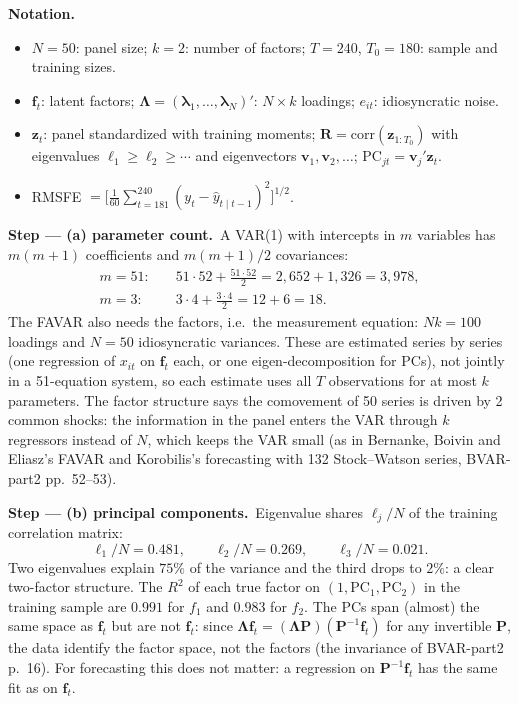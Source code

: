 \documentclass[11pt,a4paper]{article}
\newenvironment{notacao}{\par\smallskip\noindent\textbf{Notation.}\begin{itemize}[leftmargin=1.4em,topsep=1pt,itemsep=0pt]\small}{\end{itemize}}
\newcommand{\passo}[2]{\par\smallskip\noindent\textbf{Step --- #1.}~#2}
\begin{document}
\begin{sol}
\begin{notacao}
\item $N=50$: panel size; $k=2$: number of factors; $T=240$, $T_0=180$: sample and training sizes.
\item $\bm f_t$: latent factors; $\bm\Lambda=(\bm\lambda_1,\dots,\bm\lambda_N)'$: $N\times k$ loadings; $e_{it}$: idiosyncratic noise.
\item $\bm z_t$: panel standardized with training moments; $\bm R=\mathrm{corr}(\bm z_{1:T_0})$ with eigenvalues
$\ell_1\ge\ell_2\ge\cdots$ and eigenvectors $\bm v_1,\bm v_2,\dots$; $\mathrm{PC}_{jt}=\bm v_j'\bm z_t$.
\item RMSFE $=\big[\frac1{60}\sum_{t=181}^{240}(y_t-\hat y_{t\mid t-1})^2\big]^{1/2}$.
\end{notacao}

\passo{(a) parameter count}{A VAR(1) with intercepts in $m$ variables has $m(m+1)$ coefficients and $m(m+1)/2$ covariances:
\begin{align}
m=51:&\quad 51\cdot52+\frac{51\cdot52}{2}=2{,}652+1{,}326=3{,}978,\nonumber\\
m=3:&\quad 3\cdot4+\frac{3\cdot4}{2}=12+6=18.\nonumber
\end{align}
The FAVAR also needs the factors, i.e.\ the measurement equation: $Nk=100$ loadings and $N=50$ idiosyncratic
variances. These are estimated series by series (one regression of $x_{it}$ on $\bm f_t$ each, or one eigen-decomposition
for PCs), not jointly in a 51-equation system, so each estimate uses all $T$ observations for at most $k$ parameters.
The factor structure says the comovement of 50 series is driven by 2 common shocks: the information in the panel
enters the VAR through $k$ regressors instead of $N$, which keeps the VAR small (as in Bernanke, Boivin and Eliasz's
FAVAR and Korobilis's forecasting with 132 Stock--Watson series, BVAR-part2 pp.~52--53).}

\passo{(b) principal components}{Eigenvalue shares $\ell_j/N$ of the training correlation matrix:
\begin{equation}
\ell_1/N=0.481,\qquad \ell_2/N=0.269,\qquad \ell_3/N=0.021.\nonumber
\end{equation}
Two eigenvalues explain $75\%$ of the variance and the third drops to $2\%$: a clear two-factor structure. The $R^2$ of
each true factor on $(1,\mathrm{PC}_1,\mathrm{PC}_2)$ in the training sample are $0.991$ for $f_1$ and $0.983$ for $f_2$.
The PCs span (almost) the same space as $\bm f_t$ but are not $\bm f_t$: since $\bm\Lambda\bm f_t=(\bm\Lambda\bm P)(\bm P^{-1}\bm f_t)$ for
any invertible $\bm P$, the data identify the factor space, not the factors (the invariance of BVAR-part2 p.~16). For
forecasting this does not matter: a regression on $\bm P^{-1}\bm f_t$ has the same fit as on $\bm f_t$.}


\end{sol}
\end{document}
